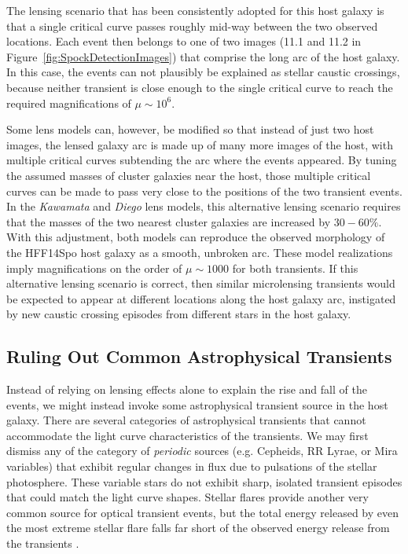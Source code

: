 The lensing scenario that has been consistently adopted for this host
galaxy  is that a single critical curve passes
roughly mid-way between the two observed \spock locations.  Each event
then belongs to one of two images (11.1 and 11.2 in
Figure~\ref{fig:SpockDetectionImages}) that comprise the long arc of
the host galaxy.  In this case, the \spock events can not plausibly be
explained as stellar caustic crossings, because neither transient is
close enough to the single critical curve to reach the required
magnifications of $\mu\sim10^6$.

Some lens models can, however, be modified so that instead of just two
host images, the lensed galaxy arc is made up of many more images of
the host, with multiple critical curves subtending the arc where the
\spock events appeared.  By tuning the assumed masses of cluster
galaxies near the \spock host, those multiple critical curves can be
made to pass very close to the positions of the two \spock transient
events.  In the {\it Kawamata} and {\it Diego} lens models, this
alternative lensing scenario requires that the masses of the two
nearest cluster galaxies are increased by $30-60\%$.  With this
adjustment, both models can reproduce the observed morphology of the
HFF14Spo host galaxy as a smooth, unbroken arc.  These model
realizations imply magnifications on the order of $\mu\sim1000$ for
both \spock transients. If this alternative lensing scenario is
correct, then similar microlensing transients would be expected to
appear at different locations along the host galaxy arc, instigated by
new caustic crossing episodes from different stars in the host galaxy.


\subsection{Ruling Out Common Astrophysical Transients}

Instead of relying on lensing effects alone to explain the rise and
fall of the \spock events, we might instead invoke some astrophysical
transient source in the host galaxy.  There are several categories of
astrophysical transients that cannot accommodate the light curve
characteristics of the \spock transients.  We may first dismiss any of
the category of {\it periodic} sources (e.g. Cepheids, RR Lyrae, or
Mira variables) that exhibit regular changes in flux due to pulsations
of the stellar photosphere. These variable stars do not exhibit sharp,
isolated transient episodes that could match the \spock light curve
shapes. Stellar flares provide another very common source for optical
transient events, but the total energy released by even the most
extreme stellar flare falls far short of the observed energy release
from the \spock transients \citep{Balona:2012,Karoff:2016} .

